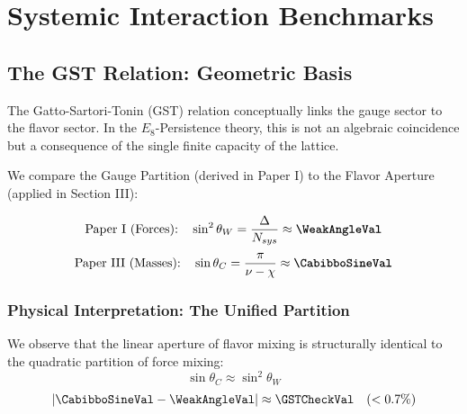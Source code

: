 

\section{Systemic Interaction Benchmarks}

\subsection{The GST Relation: Geometric Basis}
The Gatto-Sartori-Tonin (GST) relation conceptually links the gauge sector to the flavor sector. In the $E_8$-Persistence theory, this is not an algebraic coincidence but a consequence of the single finite capacity of the lattice.

We compare the Gauge Partition (derived in Paper I) to the Flavor Aperture (applied in Section III):

\begin{equation}
\text{Paper I (Forces):} \quad \sin^2 \theta_W = \frac{\Delta}{N_{sys}} \approx \textbf{\WeakAngleVal}
\end{equation}
\begin{equation}
\text{Paper III (Masses):} \quad \sin \theta_C = \frac{\pi}{\nu - \chi} \approx \textbf{\CabibboSineVal}
\end{equation}

\subsubsection{Physical Interpretation: The Unified Partition}
We observe that the linear aperture of flavor mixing is structurally identical to the quadratic partition of force mixing:
\begin{equation}
\sin \theta_C \approx \sin^2 \theta_W
\end{equation}
\begin{equation}
|\CabibboSineVal - \WeakAngleVal| \approx \GSTCheckVal \quad (< 0.7\%)
\end{equation}


